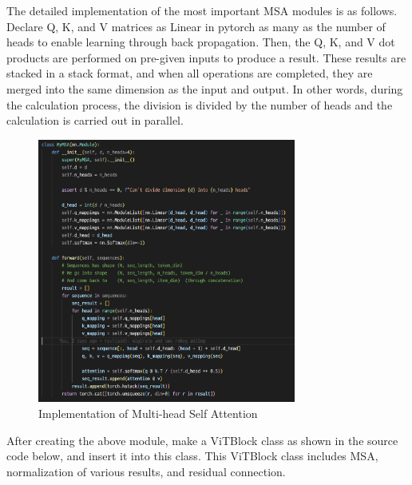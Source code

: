 The detailed implementation of the most important MSA modules is as follows. Declare Q, K, and V matrices as Linear in pytorch as many as the number of heads to enable learning through back propagation. Then, the Q, K, and V dot products are performed on pre-given inputs to produce a result. These results are stacked in a stack format, and when all operations are completed, they are merged into the same dimension as the input and output. In other words, during the calculation process, the division is divided by the number of heads and the calculation is carried out in parallel.

\begin{figure}[h]
    \centering
    \includegraphics[width=8.5cm]{images/MyMSA.png}
    \caption{Implementation of Multi-head Self Attention}
    \label{fig:enter-label}
\end{figure}

After creating the above module, make a ViTBlock class as shown in the source code below, and insert it into this class. This ViTBlock class includes MSA, normalization of various results, and residual connection.


